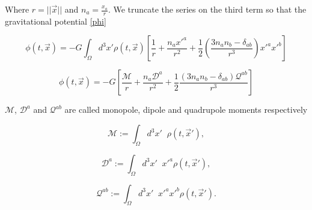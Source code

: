 Where $r = ||\vec{x}||$ and $n_a = \frac{x_a}{r}$. We truncate the series on the third term so that the gravitational potential \ref{phi} 

\begin{equation}\label{multipole0}
\phi(t, \vec{x}) = -G \int_{\Omega} d^3x' \rho(t, \vec{x}) \left[ \frac{1}{r} + \frac{n_a x'^a}{r^2} + \frac{1}{2} \left( \frac{ 3 n_a n_b -\delta_{ab} }{r^3}  \right) x'^a x'^b \right]
\end{equation}


\begin{equation}\label{multipole1}
\phi(t, \vec{x}) = -G \left[ \frac{\mathcal{M}}{r} + \frac{n_a \mathcal{D}^a}{r^2} + \frac{1}{2} \frac{ \left( 3 n_a n_b -\delta_{ab} \right) \mathcal{Q}^{ab} }{r^3} \right]
\end{equation}

$\mathcal{M}$, $\mathcal{D}^a$ and $\mathcal{Q}^{ab}$ are called monopole, dipole and quadrupole moments respectively

\begin{equation}
\mathcal{M} := \int_{\Omega} d^3x' \;\; \rho(t, \vec{x}'),
\end{equation}


\begin{equation}
\mathcal{D}^a := \int_{\Omega} d^3x' \;\; x'^a \rho(t, \vec{x}'),
\end{equation}


\begin{equation}\label{quadrupole}
\mathcal{Q}^{ab} := \int_{\Omega} d^3 x' \;\;x'^a x'^b \rho(t, \vec{x}').
\end{equation}


